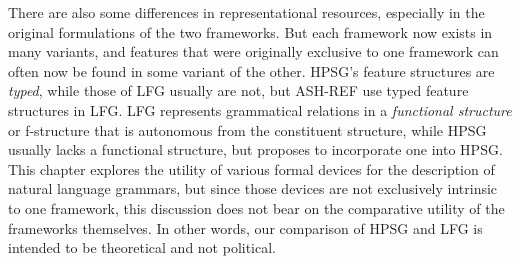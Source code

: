 There are also some differences in representational resources, especially in the original formulations of the two frameworks.
But each framework now exists in many variants, and features that were originally exclusive to one framework can often now be found in some variant of the other.   HPSG's feature structures are \textit{typed}, while those of LFG usually are not, but ASH-REF use typed feature structures in LFG.  
LFG represents grammatical relations in a \textit{functional structure} or f-structure that is autonomous from the constituent structure, while HPSG usually lacks a functional structure, but \citet{Bender2008a} proposes to incorporate one into HPSG.  This chapter explores the utility of various formal devices for the description of natural language grammars, but since those devices are not exclusively intrinsic to one framework, this discussion does not bear on the comparative utility of the frameworks themselves.   
In other words, our comparison of HPSG and LFG is intended to be theoretical and not political.  





